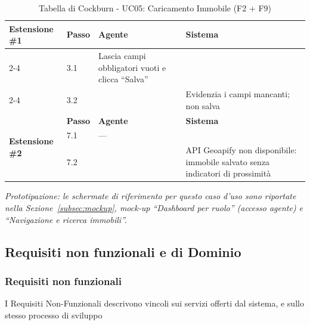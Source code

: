 \documentclass[a4paper,11pt]{article}
\begin{document}
\begin{table}[H]
\begin{tabular}{|p{2.8cm}|p{0.8cm}|p{4.2cm}|p{4.2cm}|}
\multirow{3}{2.8cm}{\textbf{Estensione \#1}}
   & \textbf{Passo} & \textbf{Agente} & \textbf{Sistema} \\ \cline{2-4}
   & 3.1 & Lascia campi obbligatori vuoti e clicca ``Salva'' & \\ \cline{2-4}
   & 3.2 & & Evidenzia i campi mancanti; non salva \\ \hline
\multirow{3}{2.8cm}{\textbf{Estensione \#2}}
   & \textbf{Passo} & \textbf{Agente} & \textbf{Sistema} \\ \cline{2-4}
   & 7.1 & --- & \\ \cline{2-4}
   & 7.2 & & API Geoapify non disponibile: immobile salvato senza indicatori di prossimità \\ \hline
\end{tabular}
\caption{Tabella di Cockburn - UC05: Caricamento Immobile (F2 + F9)}
\end{table}
\smallskip
\noindent\textit{Prototipazione: le schermate di riferimento per questo caso d'uso sono riportate nella Sezione~\ref{subsec:mockup}, mock-up ``Dashboard per ruolo'' (accesso agente) e ``Navigazione e ricerca immobili''.}

\clearpage

\newpage

\subsection{Requisiti non funzionali e di Dominio}
\subsubsection{Requisiti non funzionali}
I Requisiti Non-Funzionali descrivono vincoli sui servizi offerti dal
sistema, e sullo stesso processo di sviluppo
\end{document}
